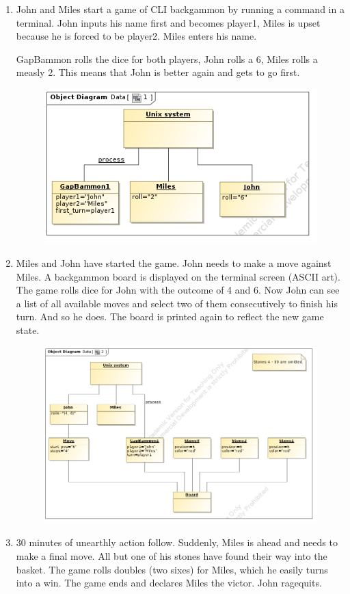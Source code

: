 \documentclass[11pt]{article}
\begin{document}
\begin{enumerate}[I]
\item John and Miles start a game of CLI backgammon by running a command in a terminal. John inputs his name first and becomes player1, Miles is upset because he is forced to be player2. Miles enters his name.
	
GapBammon rolls the dice for both players, John rolls a 6, Miles rolls a measly 2. This means that John is better again and gets to go first. 

\begin{figure}[!h]
\includegraphics[scale=0.8]{1.png}
\end{figure}
\newpage
\item Miles and John have started the game. John needs to make a move against Miles. A backgammon board is displayed on the terminal screen (ASCII art). The game rolls dice for John with the outcome of 4 and 6. Now John can see a list of all available moves and select two of them consecutively to finish his turn. And so he does. The board is printed again to reflect the new game state.

\begin{figure}[!h]
\includegraphics[scale=0.5]{2.png}
\end{figure}
\newpage
\item 30 minutes of unearthly action follow. Suddenly, Miles is ahead and needs to make a final move. All but one of his stones have found their way into the basket. The game rolls doubles (two sixes) for Miles, which he easily turns into a win. The game ends and declares Miles the victor. 
John ragequits.


\end{enumerate}
\end{document}
